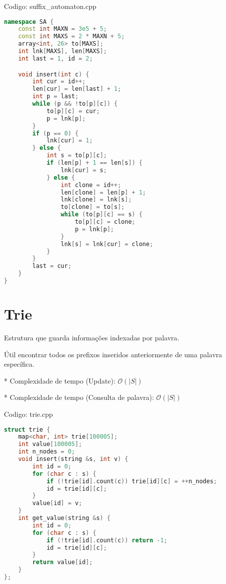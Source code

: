 \documentclass[10pt, a4paper, oneside]{book}
\begin{document}
\hfill

Codigo: suffix\_automaton.cpp

\begin{lstlisting}[language=C++]
namespace SA {
    const int MAXN = 3e5 + 5;
    const int MAXS = 2 * MAXN + 5;
    array<int, 26> to[MAXS];
    int lnk[MAXS], len[MAXS];
    int last = 1, id = 2;

    void insert(int c) {
        int cur = id++;
        len[cur] = len[last] + 1;
        int p = last;
        while (p && !to[p][c]) {
            to[p][c] = cur;
            p = lnk[p];
        }
        if (p == 0) {
            lnk[cur] = 1;
        } else {
            int s = to[p][c];
            if (len[p] + 1 == len[s]) {
                lnk[cur] = s;
            } else {
                int clone = id++;
                len[clone] = len[p] + 1;
                lnk[clone] = lnk[s];
                to[clone] = to[s];
                while (to[p][c] == s) {
                    to[p][c] = clone;
                    p = lnk[p];
                }
                lnk[s] = lnk[cur] = clone;
            }
        }
        last = cur;
    }
}
\end{lstlisting}
\hfill

\section{Trie}


Estrutura que guarda informações indexadas por palavra.   



Útil encontrar todos os prefixos inseridos anteriormente de uma palavra específica.



* Complexidade de tempo (Update): $\mathcal{O}(|S|)$

* Complexidade de tempo (Consulta de palavra): $\mathcal{O}(|S|)$

\hfill

Codigo: trie.cpp

\begin{lstlisting}[language=C++]
struct trie {
    map<char, int> trie[100005];
    int value[100005];
    int n_nodes = 0;
    void insert(string &s, int v) {
        int id = 0;
        for (char c : s) {
            if (!trie[id].count(c)) trie[id][c] = ++n_nodes;
            id = trie[id][c];
        }
        value[id] = v;
    }
    int get_value(string &s) {
        int id = 0;
        for (char c : s) {
            if (!trie[id].count(c)) return -1;
            id = trie[id][c];
        }
        return value[id];
    }
};
\end{lstlisting}
\hfill
\end{document}
